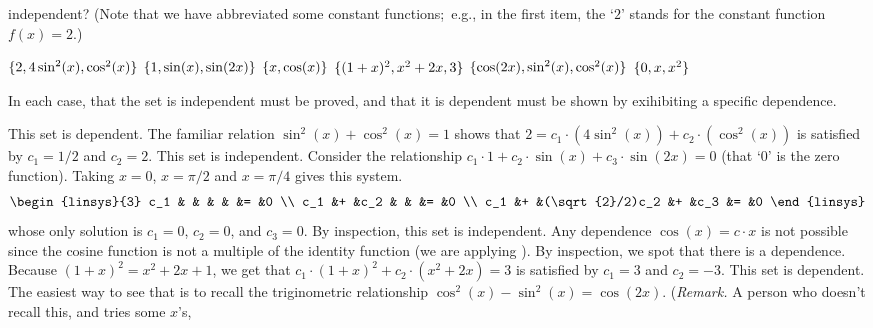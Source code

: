 \begin{exercises}
    independent?
    (Note that we have abbreviated some constant functions;~e.g., 
     in the first item, 
     the `$2$' stands for the constant function $f(x)=2$.)
    \begin{exparts*}
      \partsitem \( \mbox{$\{2,4\sin^2(x),\cos^2(x)\}$} \)
      \partsitem \( \mbox{$\{1,\sin(x),\sin(2x)\}$} \)
      \partsitem \( \mbox{$\{x,\cos(x)\}$} \)
      \partsitem \( \mbox{$\{(1+x)^2,x^2+2x,3\}$} \)
      \partsitem \( \mbox{$\{\cos(2x),\sin^2(x),\cos^2(x)\}$} \)
      \partsitem \( \mbox{$\{0,x,x^2\}$} \)
    \end{exparts*}
    \begin{answer}
      In each case, that the set is independent must be proved, and that it is
      dependent must be shown by exihibiting a specific dependence.
      \begin{exparts}
        \partsitem This set is dependent.
          The familiar relation $\sin^2(x)+\cos^2(x)=1$ shows that
          $2=c_1\cdot(4\sin^2(x))+c_2\cdot(\cos^2(x))$ is satisfied by
          $c_1=1/2$ and $c_2=2$.
        \partsitem This set is independent.
          Consider the relationship
          $c_1\cdot 1+c_2\cdot\sin(x)+c_3\cdot\sin(2x)=0$
          (that `$0$' is the zero function).
          Taking $x=0$, $x=\pi/2$ and $x=\pi/4$ gives this system.
          \begin{equation*}
            \begin{linsys}{3}
               c_1  &   &                &   &      &=  &0  \\
               c_1  &+  &c_2             &   &      &=  &0  \\
               c_1  &+  &(\sqrt{2}/2)c_2 &+  &c_3   &=  &0  
            \end{linsys}
          \end{equation*}
          whose only solution is 
          $c_1=0$, $c_2=0$, and $c_3=0$. 
        \partsitem By inspection, this set is independent.
          Any dependence $\cos(x)=c\cdot x$ is not possible since the cosine
          function is not a multiple of the identity function
          (we are applying ).
        \partsitem By inspection, we spot that there is a dependence.
          Because $(1+x)^2=x^2+2x+1$, we get that
          $c_1\cdot(1+x)^2+c_2\cdot(x^2+2x)=3$ is satisfied by 
          $c_1=3$ and $c_2=-3$.
        \partsitem This set is dependent.
          The easiest way to see that is to recall the triginometric
          relationship $\cos^2(x)-\sin^2(x)=\cos(2x)$.
          (\textit{Remark.} 
          A person who doesn't recall this, and tries some $x$'s,

\end{exparts}
\end{answer}
\end{exercises}
